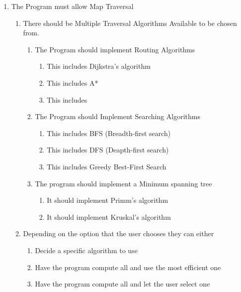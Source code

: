 \begin{flushleft}
\begin{enumerate}
            \item The Program must allow Map Traversal
            \begin{enumerate}
                \item There should be Multiple Traversal Algorithms Available to be chosen from.
                    \begin{enumerate}
                        \item The Program should implement Routing Algorithms 
                        \begin{enumerate}
                            \item This includes Dijkstra's algorithm
                            \item This includes A*
                            \item This includes
                        \end{enumerate}
                        \item The Program should Implement Searching Algorithms
                        \begin{enumerate}
                            \item This includes BFS (Breadth-first search)
                            \item This includes DFS (Deapth-first search)
                            \item This includes Greedy Best-First Search
                        \end{enumerate}
                        \item The program should implement a Minimum spanning tree
                        \begin{enumerate}
                            \item It should implement Primm's algorithm
                            \item It should implement Kruskal's algorithm
                        \end{enumerate}
                    \end{enumerate}
                \item Depending on the option that the user chooses they can either
                \begin{enumerate}
                    \item Decide a specific algorithm to use
                    \item Have the program compute all and use the most efficient one
                    \item Have the program compute all and let the user select one
                \end{enumerate}
            \end{enumerate}
            

\end{enumerate}
\end{flushleft}
